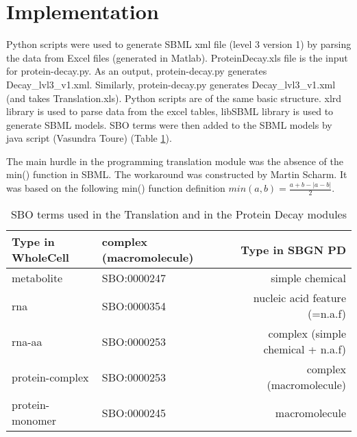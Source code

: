 \documentclass[10pt]{article}
\begin{document}
\section{Implementation}
 Python scripts were used to generate  SBML xml file (level 3 version 1) by parsing  the data from Excel files (generated in Matlab). 
ProteinDecay.xls file is the input for protein-decay.py. As an output, protein-decay.py generates Decay\_lvl3\_v1.xml. Similarly, protein-decay.py generates Decay\_lvl3\_v1.xml (and takes Translation.xls).
Python scripts are of the same basic structure. xlrd library is used to parse data from the excel tables, libSBML library is used to generate SBML models. 
SBO terms were then added to the SBML models by java script (Vasundra Toure) (Table \ref{SBOterms}).

The main hurdle in the programming translation module was the absence of the min() function in SBML.  
The workaround was constructed by Martin Scharm. It was based on the following min() function definition $min(a,b)=\frac{a+b-|a-b|}{2}$. 


\begin{table}[tb]
\centering
\footnotesize
\caption{\label{SBOterms} SBO terms used in the Translation and in the Protein Decay modules}
\begin{tabular}{llr}\hline			
Type in WholeCell 	& complex (macromolecule)	& Type in SBGN PD	\\
\hline
metabolite 	& SBO:0000247 	& simple chemical	\\
rna 	& SBO:0000354 	& nucleic acid feature (=n.a.f)	\\
rna-aa 	& SBO:0000253 	& complex (simple chemical + n.a.f)	\\
protein-complex 	& SBO:0000253 	& complex (macromolecule)	\\
protein-monomer 	& SBO:0000245 	& macromolecule	\\
\hline
\end{tabular}
\end{table}



%
\end{document}
